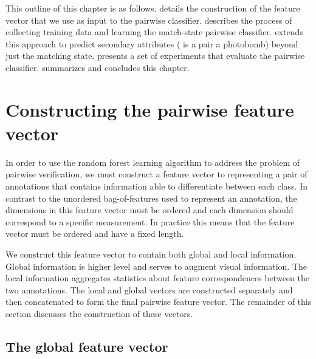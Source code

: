 This outline of this chapter is as follows.
 details the construction of the feature vector that we use as input to the pairwise
  classifier.
 describes the process of collecting training data and learning the match-state pairwise
  classifier.
 extends this approach to predict secondary attributes (\eg{} is a pair a photobomb) beyond
  just the matching state.
 presents a set of experiments that evaluate the pairwise classifier.
 summarizes and concludes this chapter.


\section{Constructing the pairwise feature vector}\label{sec:pairfeat}

In order to use the random forest learning algorithm to address the problem of pairwise verification, we must
  construct a feature vector to representing a pair of annotations that contains information able to differentiate
  between each class.
In contrast to the unordered bag-of-features used to represent an annotation, the dimensions in this feature
  vector must be ordered and each dimension should correspond to a specific measurement.
In practice this means that the feature vector must be ordered and have a fixed length.

We construct this feature vector to contain both global and local information.
Global information is higher level and serves to augment visual information.
The local information aggregates statistics about feature correspondences between the two annotations.
The local and global vectors are constructed separately and then concatenated to form the final pairwise feature
  vector.
The remainder of this section discusses the construction of these vectors.

\subsection{The global feature vector}

